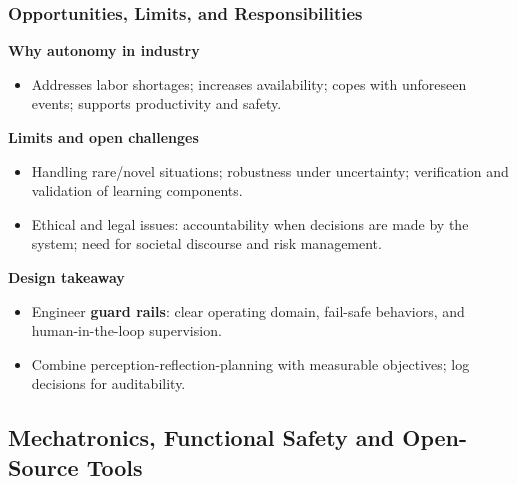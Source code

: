 \begin{frame}
	\frametitle{Opportunities, Limits, and Responsibilities}
  \textbf{Why autonomy in industry}
  \begin{itemize}
    \item Addresses labor shortages; increases availability; copes with unforeseen events; supports productivity and safety.
  \end{itemize}
  \textbf{Limits and open challenges}
  \begin{itemize}
    \item Handling rare/novel situations; robustness under uncertainty; verification and validation of learning components.
    \item Ethical and legal issues: accountability when decisions are made by the system; need for societal discourse and risk management.
  \end{itemize}
  \textbf{Design takeaway}
  \begin{itemize}
    \item Engineer \textbf{guard rails}: clear operating domain, fail-safe behaviors, and human-in-the-loop supervision.
    \item Combine perception-reflection-planning with measurable objectives; log decisions for auditability.
  \end{itemize}
\end{frame}

\subsection{Mechatronics, Functional Safety and Open-Source Tools}


